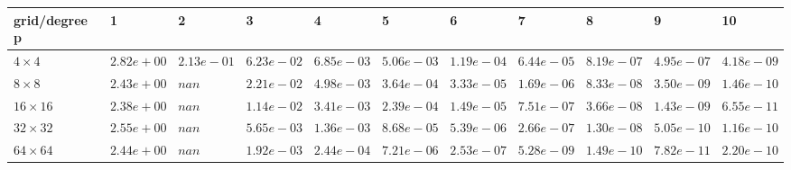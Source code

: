\begin{tabular}{lllllllllll}
\hline
 grid/degree p   & 1          & 2          & 3          & 4          & 5          & 6          & 7          & 8          & 9          & 10         \\
\hline
 $4 \times 4$    & $2.82e+00$ & $2.13e-01$ & $6.23e-02$ & $6.85e-03$ & $5.06e-03$ & $1.19e-04$ & $6.44e-05$ & $8.19e-07$ & $4.95e-07$ & $4.18e-09$ \\
 $8 \times 8$    & $2.43e+00$ & $nan$      & $2.21e-02$ & $4.98e-03$ & $3.64e-04$ & $3.33e-05$ & $1.69e-06$ & $8.33e-08$ & $3.50e-09$ & $1.46e-10$ \\
 $16 \times 16$  & $2.38e+00$ & $nan$      & $1.14e-02$ & $3.41e-03$ & $2.39e-04$ & $1.49e-05$ & $7.51e-07$ & $3.66e-08$ & $1.43e-09$ & $6.55e-11$ \\
 $32 \times 32$  & $2.55e+00$ & $nan$      & $5.65e-03$ & $1.36e-03$ & $8.68e-05$ & $5.39e-06$ & $2.66e-07$ & $1.30e-08$ & $5.05e-10$ & $1.16e-10$ \\
 $64 \times 64$  & $2.44e+00$ & $nan$      & $1.92e-03$ & $2.44e-04$ & $7.21e-06$ & $2.53e-07$ & $5.28e-09$ & $1.49e-10$ & $7.82e-11$ & $2.20e-10$ \\
\hline
\end{tabular}